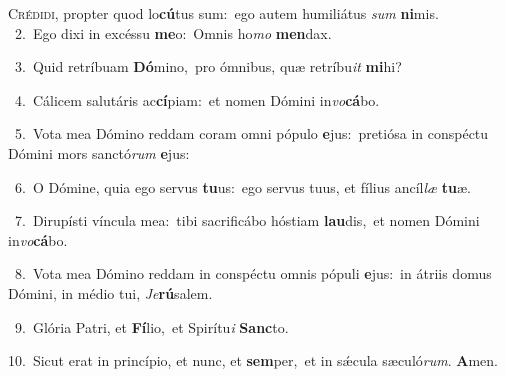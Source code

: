 \lettrine{\initial\textcolor{\initialcolor}{C}}{rédidi,} propter quod lo\-\textbf{cú}\-tus sum:~\star ego autem humiliátus \textit{sum} \textbf{ni}\-mis.\\
{\numbfont\textcolor{\numbcolor}{~2.}}~Ego dixi in excéssu \textbf{me}\-o:~\star Omnis ho\textit{mo} \textbf{men}\-dax.\par
{\numbfont\textcolor{\numbcolor}{~3.}}~Quid retríbuam \textbf{Dó}\-mino,~\star pro ómnibus, quæ retríbu\textit{it} \textbf{mi}\-hi?\par
{\numbfont\textcolor{\numbcolor}{~4.}}~Cálicem salutáris ac\-\textbf{cí}\-piam:~\star et nomen Dómini in\-\textit{vo}\-\textbf{cá}bo.\par
{\numbfont\textcolor{\numbcolor}{~5.}}~Vota mea Dómino reddam coram omni pópulo \textbf{e}\-jus:~\star pretiósa in conspéctu Dómini mors sanctó\textit{rum} \textbf{e}\-jus:\par
{\numbfont\textcolor{\numbcolor}{~6.}}~O Dómine, quia ego servus \textbf{tu}\-us:~\star ego servus tuus, et fílius ancíl\textit{læ} \textbf{tu}\-æ.\par
{\numbfont\textcolor{\numbcolor}{~7.}}~Dirupísti víncula mea:~\dagger tibi sacrificábo hóstiam \textbf{lau}\-dis,~\star et nomen Dómini in\-\textit{vo}\-\textbf{cá}bo.\par
{\numbfont\textcolor{\numbcolor}{~8.}}~Vota mea Dómino reddam in conspéctu omnis pópuli \textbf{e}\-jus:~\star in átriis domus Dómini, in médio tui, \textit{Je}\-\textbf{rú}salem.\par
{\numbfont\textcolor{\numbcolor}{~9.}}~Glória Patri, et \textbf{Fí}\-lio,~\star et Spirítu\textit{i} \textbf{Sanc}\-to.\par
{\numbfont\textcolor{\numbcolor}{10.}}~Sicut erat in princípio, et nunc, et \textbf{sem}\-per,~\star et in sǽcula sæculó\-\textit{rum}\-. \textbf{A}\-men.\par
